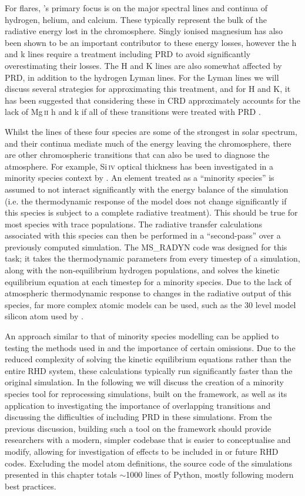 For flares, \Radyn{}'s primary focus is on the major spectral lines and continua of hydrogen, helium, and calcium.
These typically represent the bulk of the radiative energy lost in the chromosphere.
Singly ionised magnesium has also been shown to be an important contributor to these energy losses, however the h and k lines require a treatment including PRD to avoid significantly overestimating their losses.
The \Caii{} H and K lines are also somewhat affected by PRD, in addition to the hydrogen Lyman lines.
For the Lyman lines we will discuss several strategies for approximating this treatment, and for \Caii{} H and K, it has been suggested that considering these in CRD approximately accounts for the lack of Mg\,\textsc{ii} h and k if all of these transitions were treated with PRD \citep{Kerr2019a}.

Whilst the lines of these four species are some of the strongest in solar spectrum, and their continua mediate much of the energy leaving the chromosphere, there are other chromospheric transitions that can also be used to diagnose the atmosphere.
For example, Si\,\textsc{iv} optical thickness has been investigated in a minority species context by \citet{Kerr2019c}.
An element treated as a ``minority species'' is assumed to not interact significantly with the energy balance of the simulation (i.e. the thermodynamic response of the model does not change significantly if this species is subject to a complete radiative treatment).
This should be true for most species with trace populations.
The radiative transfer calculations associated with this species can then be performed in a ``second-pass'' over a previously computed \Radyn{} simulation.
The MS\_RADYN code was designed for this task; it takes the thermodynamic parameters from every timestep of a \Radyn{} simulation, along with the non-equilibrium hydrogen populations, and solves the kinetic equilibrium equation at each timestep for a minority species.
Due to the lack of atmospheric thermodynamic response to changes in the radiative output of this species, far more complex atomic models can be used, such as the 30 level model silicon atom used by \citet{Kerr2019c}.

An approach similar to that of minority species modelling can be applied to testing the methods used in \Radyn{} and the importance of certain omissions.
Due to the reduced complexity of solving the kinetic equilibrium equations rather than the entire RHD system, these calculations typically run significantly faster than the original simulation.
In the following we will discuss the creation of a minority species tool for reprocessing \Radyn{} simulations, built on the \Lw{} framework, as well as its application to investigating the importance of overlapping transitions and discussing the difficulties of including PRD in these simulations.
From the previous discussion, building such a tool on the \Lw{} framework should provide researchers with a modern, simpler codebase that is easier to conceptualise and modify, allowing for investigation of effects to be included in \Radyn{} or future RHD codes.
Excluding the model atom definitions, the source code of the simulations presented in this chapter totals $\sim$1000 lines of Python, mostly following modern best practices.

